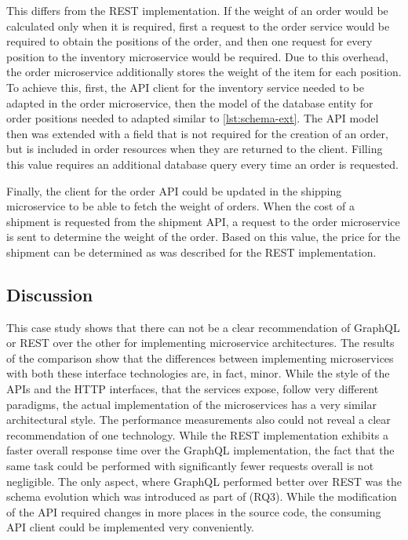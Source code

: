 This differs from the \ac{REST} implementation.
If the weight of an order would be calculated only when it is required, first a request to the order service would be required to obtain the positions of the order, and then one request for every position to the inventory microservice would be required.
Due to this overhead, the order microservice additionally stores the weight of the item for each position.
To achieve this, first, the \ac{API} client for the inventory service needed to be adapted in the order microservice, then the model of the database entity for order positions needed to adapted similar to \autoref{lst:schema-ext}.
The \ac{API} model then was extended with a field that is not required for the creation of an order, but is included in order resources when they are returned to the client.
Filling this value requires an additional database query every time an order is requested.

Finally, the client for the order \ac{API} could be updated in the shipping microservice to be able to fetch the weight of orders.
When the cost of a shipment is requested from the shipment \ac{API}, a request to the order microservice is sent to determine the weight of the order.
Based on this value, the price for the shipment can be determined as was described for the \ac{REST} implementation.

\subsection{Discussion}\label{sec:cs-disc}

This case study shows that there can not be a clear recommendation of GraphQL or \ac{REST} over the other for implementing microservice architectures.
The results of the comparison show that the differences between implementing microservices with both these interface technologies are, in fact, minor.
While the style of the \acp{API} and the \ac{HTTP} interfaces, that the services expose, follow very different paradigms, the actual implementation of the microservices has a very similar architectural style.
The performance measurements also could not reveal a clear recommendation of one technology.
While the \ac{REST} implementation exhibits a faster overall response time over the GraphQL implementation, the fact that the same task could be performed with significantly fewer requests overall is not negligible.
The only aspect, where GraphQL performed better over \ac{REST} was the schema evolution which was introduced as part of (\acs{RQ}3).
While the modification of the \ac{API} required changes in more places in the source code, the consuming \ac{API} client could be implemented very conveniently.

